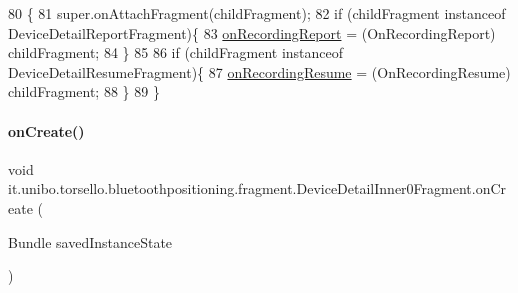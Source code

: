 \begin{DoxyCode}
80                                                          \{
81         super.onAttachFragment(childFragment);
82         \textcolor{keywordflow}{if} (childFragment instanceof DeviceDetailReportFragment)\{
83             \hyperlink{classit_1_1unibo_1_1torsello_1_1bluetoothpositioning_1_1fragment_1_1DeviceDetailInner0Fragment_afb73345c725b2c9ad4b430915d5f1b15_afb73345c725b2c9ad4b430915d5f1b15}{onRecordingReport} = (OnRecordingReport) childFragment;
84         \}
85 
86         \textcolor{keywordflow}{if} (childFragment instanceof DeviceDetailResumeFragment)\{
87             \hyperlink{classit_1_1unibo_1_1torsello_1_1bluetoothpositioning_1_1fragment_1_1DeviceDetailInner0Fragment_a8603d0fe3501a6267a8cf9f9f0d29360_a8603d0fe3501a6267a8cf9f9f0d29360}{onRecordingResume} = (OnRecordingResume) childFragment;
88         \}
89     \}
\end{DoxyCode}
\hypertarget{classit_1_1unibo_1_1torsello_1_1bluetoothpositioning_1_1fragment_1_1DeviceDetailInner0Fragment_a799f69a27b82be0bf972611b1743e8bd_a799f69a27b82be0bf972611b1743e8bd}{}\label{classit_1_1unibo_1_1torsello_1_1bluetoothpositioning_1_1fragment_1_1DeviceDetailInner0Fragment_a799f69a27b82be0bf972611b1743e8bd_a799f69a27b82be0bf972611b1743e8bd} 
\paragraph{\texorpdfstring{on\+Create()}{onCreate()}}
{\footnotesize\ttfamily void it.\+unibo.\+torsello.\+bluetoothpositioning.\+fragment.\+Device\+Detail\+Inner0\+Fragment.\+on\+Create (\begin{DoxyParamCaption}\item[{Bundle}]{saved\+Instance\+State }\end{DoxyParamCaption})}


